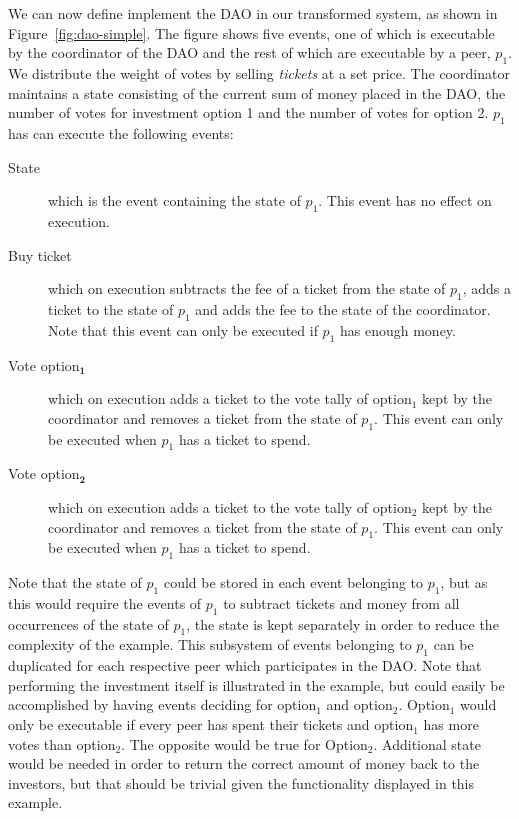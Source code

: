 \documentclass{article}
\begin{document}
	We can now define implement the DAO in our transformed system, as shown in Figure~\ref{fig:dao-simple}.
	The figure shows five events, one of which is executable by the coordinator of the DAO and the rest of which are executable by a peer, $p_1$.
	We distribute the weight of votes by selling \textit{tickets} at a set price.
	The coordinator maintains a state consisting of the current sum of money placed in the DAO, the number of votes for investment option 1 and the number of votes for option 2.
	$p_1$ has can execute the following events:
	\begin{description}
		\item[State] which is the event containing the state of $p_1$. This event has no effect on execution.
		\item[Buy ticket] which on execution subtracts the fee of a ticket from the state of $p_1$, adds a ticket to the state of $p_1$ and adds the fee to the state of the coordinator.
		Note that this event can only be executed if $p_1$ has enough money.
		\item[Vote option$_\textbf{1}$] which on execution adds a ticket to the vote tally of option$_1$ kept by the coordinator and removes a ticket from the state of $p_1$.
		This event can only be executed when $p_1$ has a ticket to spend.
		\item[Vote option$_\textbf{2}$] which on execution adds a ticket to the vote tally of option$_2$ kept by the coordinator and removes a ticket from the state of $p_1$.
		This event can only be executed when $p_1$ has a ticket to spend.
	\end{description}
	Note that the state of $p_1$ could be stored in each event belonging to $p_1$, but as this would require the events of $p_1$ to subtract tickets and money from all occurrences of the state of $p_1$, the state is kept separately in order to reduce the complexity of the example.
	This subsystem of events belonging to $p_1$ can be duplicated for each respective peer which participates in the DAO.
	Note that performing the investment itself is illustrated in the example, but could easily be accomplished by having events deciding for option$_1$ and option$_2$.
	Option$_1$ would only be executable if every peer has spent their tickets and option$_1$ has more votes than option$_2$.
	The opposite would be true for Option$_2$.
	Additional state would be needed in order to return the correct amount of money back to the investors, but that should be trivial given the functionality displayed in this example.
\end{document}
